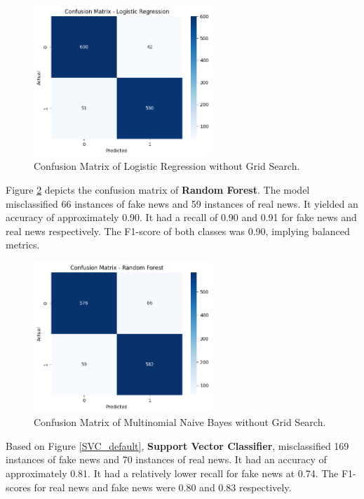 \begin{figure}[h!]
    \centering
    \includegraphics[width=0.6\textwidth,height=0.6\textheight, keepaspectratio]{figures/hyperparam/LR_default.png}
        \caption{Confusion Matrix of Logistic Regression without Grid Search.}
        \label{LR_default}
\end{figure}

Figure \ref{RF_default} depicts the confusion matrix of \textbf{Random Forest}. The model misclassified 66 instances of fake news and 59 instances of real news. It yielded an accuracy of approximately 0.90. It had a recall of 0.90 and 0.91 for fake news and real news respectively. The F1-score of both classes was 0.90, implying balanced metrics.

\begin{figure}[h!]
    \centering
    \includegraphics[width=0.6\textwidth,height=0.6\textheight, keepaspectratio]{figures/hyperparam/RF_default.png}
        \caption{Confusion Matrix of Multinomial Naive Bayes without Grid Search.}
        \label{RF_default}
\end{figure}

Based on Figure \ref{SVC_default}, \textbf{Support Vector Classifier}, misclassified 169 instances of fake news and 70 instances of real news. It had an accuracy of approximately 0.81. It had a relatively lower recall for fake news at 0.74. The F1-scores for real news and fake news were 0.80 and 0.83 respectively. 

